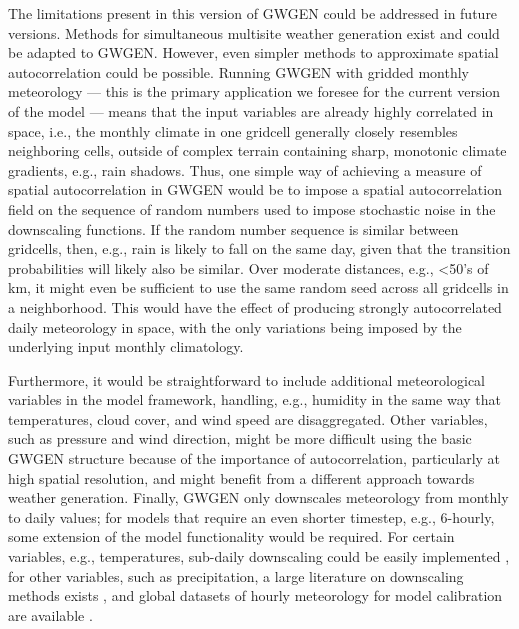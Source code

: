 \documentclass[
11pt, %
english, %
singlespacing, %
headsepline, %
]{MastersDoctoralThesis} %
\begin{document}
\begin{NoHyper}
\begin{refsection}
The limitations present in this version of GWGEN could be addressed in future versions. Methods for simultaneous multisite weather generation exist \citep{Wilks1998,Wilks1999a,Wilks1999b} and could be adapted to GWGEN. However, even simpler methods to approximate spatial autocorrelation could be possible. Running GWGEN with gridded monthly meteorology --- this is the primary application we foresee for the current version of the model --- means that the input variables are already highly correlated in space, i.e., the monthly climate in one gridcell generally closely resembles neighboring cells, outside of complex terrain containing sharp, monotonic climate gradients, e.g., rain shadows. Thus, one simple way of achieving a measure of spatial autocorrelation in GWGEN would be to impose a spatial autocorrelation field on the sequence of random numbers used to impose stochastic noise in the downscaling functions. If the random number sequence is similar between gridcells, then, e.g., rain is likely to fall on the same day, given that the transition probabilities will likely also be similar. Over moderate distances, e.g., <50's of km, it might even be sufficient to use the same random seed across all gridcells in a neighborhood. This would have the effect of producing strongly autocorrelated daily meteorology in space, with the only variations being imposed by the underlying input monthly climatology.

Furthermore, it would be straightforward to include additional meteorological variables in the model framework, handling, e.g., humidity in the same way that temperatures, cloud cover, and wind speed are disaggregated. Other variables, such as pressure and wind direction, might be more difficult using the basic GWGEN structure because of the importance of autocorrelation, particularly at high spatial resolution, and might benefit from a different approach towards weather generation. Finally, GWGEN only downscales meteorology from monthly to daily values; for models that require an even shorter timestep, e.g., 6-hourly, some extension of the model functionality would be required. For certain variables, e.g., temperatures, sub-daily downscaling could be easily implemented \citep{CesaraccioSpanoDuceEtAl2001}, for other variables, such as precipitation, a large literature on downscaling methods exists \citep[e.g.][]{BennettRobertsonWardEtAl2016}, and global datasets of hourly meteorology for model calibration are available \citep[e.g., the Integrated Surface Database,][]{SmithLottVose2011}.



\end{refsection}
\end{NoHyper}
\end{document}
